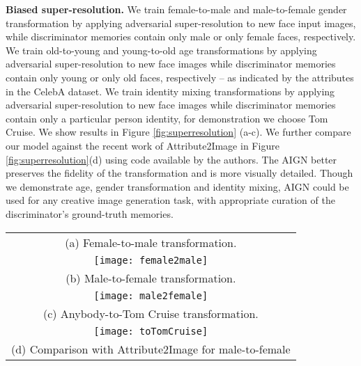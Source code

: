 \documentclass[10pt,twocolumn,letterpaper]{article}
\begin{document}
\begin{bibunit}[ieee]
\begin{comment}
\end{comment}\textbf{Biased super-resolution.} We train female-to-male and male-to-female gender  transformation by applying  adversarial super-resolution to new face input images, while discriminator memories contain only male or only female faces,  respectively. We train old-to-young and young-to-old age   transformations by applying  adversarial super-resolution to new face images while discriminator memories contain only young or only old faces,  respectively -- as indicated by the attributes in the CelebA dataset. 
We train identity mixing transformations by applying  adversarial super-resolution to new face images while discriminator memories contain only a particular person identity, for demonstration we choose Tom Cruise. We show results in Figure \ref{fig:superresolution} (a-c). 
We further compare our model against the recent work of  Attribute2Image\cite{DBLP:journals/corr/YanYSL15} in Figure \ref{fig:superresolution}(d) using code available by the authors. The AIGN better preserves the fidelity of the transformation and is more visually detailed. Though we demonstrate age, gender transformation and identity mixing, AIGN could be used for any creative image generation task, with appropriate curation of the discriminator's ground-truth memories. 
\begin{tabular}{c}
\small{(a) Female-to-male transformation.} \\
\vspace{2mm}
\texttt{[image: female2male]} \\
\small{(b) Male-to-female transformation.} \\
\vspace{2mm}
\texttt{[image: male2female]} \\
\small{(c) Anybody-to-Tom Cruise transformation.} \\
\vspace{2mm}
\texttt{[image: toTomCruise]} \\
\small{(d) Comparison with Attribute2Image \cite{DBLP:journals/corr/YanYSL15} for male-to-female}\\

\end{tabular}
\end{bibunit}
\end{document}
